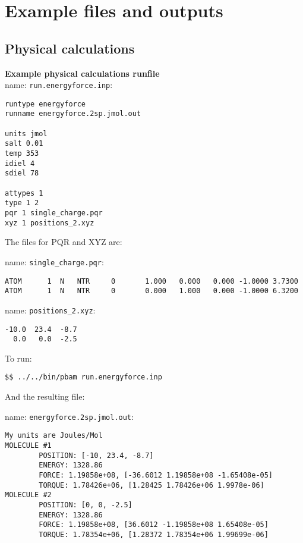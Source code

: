 \clearpage




\chapter{Example files and outputs}

\section{Physical calculations}

\textbf{Example physical calculations runfile} \\

name:  \texttt{run.energyforce.inp}:
\begin{lstlisting}[style = MyBash]
runtype energyforce
runname energyforce.2sp.jmol.out

units jmol
salt 0.01
temp 353
idiel 4 
sdiel 78

attypes 1
type 1 2
pqr 1 single_charge.pqr
xyz 1 positions_2.xyz
\end{lstlisting}
\medskip

The files for PQR and XYZ are: 

name:  \texttt{single\_charge.pqr}:
\begin{lstlisting}[style = MyBash]
ATOM      1  N   NTR     0       1.000   0.000   0.000 -1.0000 3.7300
ATOM      1  N   NTR     0       0.000   1.000   0.000 -1.0000 6.3200
\end{lstlisting}

\medskip

name:  \texttt{positions\_2.xyz}:
\begin{lstlisting}[style = MyBash]
-10.0  23.4  -8.7
  0.0   0.0  -2.5
\end{lstlisting}
\medskip

To run: 
\begin{lstlisting}[style = MyBash]
$$ ../../bin/pbam run.energyforce.inp
\end{lstlisting}
\medskip

And the resulting file: 

name: \texttt{energyforce.2sp.jmol.out}:
\begin{lstlisting}[style = MyBash]
My units are Joules/Mol
MOLECULE #1
        POSITION: [-10, 23.4, -8.7]
        ENERGY: 1328.86
        FORCE: 1.19858e+08, [-36.6012 1.19858e+08 -1.65408e-05]
        TORQUE: 1.78426e+06, [1.28425 1.78426e+06 1.9978e-06]
MOLECULE #2
        POSITION: [0, 0, -2.5]
        ENERGY: 1328.86
        FORCE: 1.19858e+08, [36.6012 -1.19858e+08 1.65408e-05]
        TORQUE: 1.78354e+06, [1.28372 1.78354e+06 1.99699e-06]
\end{lstlisting}


